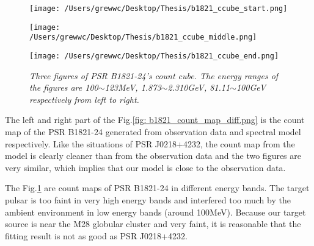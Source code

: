 \documentclass[12pt]{report}
\newcommand{\mycaption}[1]{\caption{\textit{\footnotesize #1}}}
\begin{document}
              \begin{figure}[!ht]
                \begin{center}
                \begin{minipage}{0.32\textwidth}
                  \begin{center} 
                    \texttt{[image: /Users/grewwc/Desktop/Thesis/b1821\_ccube\_start.png]}
                  \end{center}
                \end{minipage}
                \begin{minipage}{0.32\textwidth}
                  \begin{center}
                    \texttt{[image: /Users/grewwc/Desktop/Thesis/b1821\_ccube\_middle.png]}
                  \end{center}
                \end{minipage}
                \begin{minipage}{0.32\textwidth}
                  \begin{center}
                  \texttt{[image: /Users/grewwc/Desktop/Thesis/b1821\_ccube\_end.png]}
                  \end{center}
                \end{minipage}
              \end{center}
              \mycaption{Three figures of PSR B1821-24's count cube. The energy ranges of the figures are  
                100$\sim$123MeV, 1.873$\sim$2.310GeV, 81.11$\sim$100GeV respectively from left to right.}
              \label{fig: b1821_ccube_1_15_33.png}
              \end{figure}

              The left and right part of the Fig.\ref{fig: b1821_count_map_diff.png} is the count 
              map of the PSR B1821-24 generated from observation data and spectral model respectively. 
              Like the situations of PSR J0218+4232, the count map from the model is clearly cleaner than 
              from the observation data and the two figures are very similar, which implies that our model 
              is close to the observation data. 

              The Fig.\ref{fig: b1821_ccube_1_15_33.png} are count maps of PSR B1821-24 in different energy 
              bands. The target pulsar is too faint in very high energy bands and interfered too much by the ambient 
              environment in low energy bands (around 100MeV). Because our target source is near the M28 globular 
              cluster and very faint, it is reasonable that the fitting result is not as good as PSR J0218+4232. 
\end{document}
